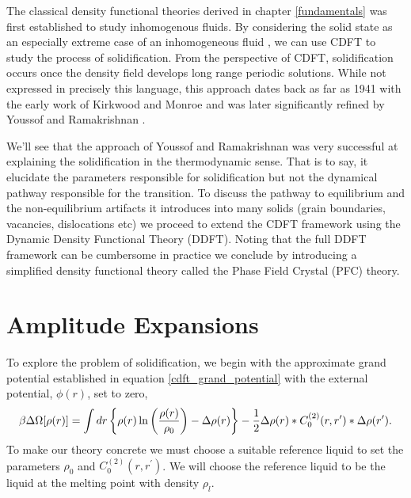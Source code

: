 \label{dft_of_freezing}

The classical density functional theories derived in chapter \ref{fundamentals}
was first established to study inhomogenous fluids.  By considering the solid
state as an especially extreme case of an inhomogeneous fluid
\cite{HANSEN-CH6}, we can use CDFT to study the process of solidification. From
the perspective of CDFT, solidification occurs once the density field develops
long range periodic solutions.  While not expressed in precisely this language,
this approach dates back as far as 1941 with the early work of Kirkwood and Monroe
\cite{KIRKWOOD_MONROE41} and was later significantly refined by Youssof and
Ramakrishnan \cite{RAMAKRISHNAN79}.

We'll see that the approach of Youssof and Ramakrishnan was very successful at 
explaining the solidification in the thermodynamic sense. That is to say, it
elucidate the parameters responsible for solidification but not the dynamical 
pathway responsible for the transition. To discuss the pathway to equilibrium
and the non-equilibrium artifacts it introduces into many solids (grain 
boundaries, vacancies, dislocations etc) we proceed to extend the CDFT framework
using the Dynamic Density Functional Theory (DDFT). Noting that the full DDFT
framework can be cumbersome in practice we conclude by introducing a simplified
density functional theory called the Phase Field Crystal (PFC) theory.

\section{Amplitude Expansions} %

To explore the problem of solidification, we begin with the approximate grand
potential established in equation \ref{cdft_grand_potential} with the external
potential, $\phi(r)$, set to zero,
%
\begin{equation}
    \beta \Delta \Omega[\rho(r)] =
        \int dr \left\lbrace 
            \rho(r)\ln\left(\frac{\rho(r)}{\rho_0}\right) - \Delta\rho(r)\right\rbrace
        - \frac{1}{2} \Delta\rho(r) \ast C^{(2)}_0(r, r^\prime)
            \ast \Delta\rho(r^\prime).
\end{equation}
%
To make our theory concrete we must choose a suitable reference liquid to set
the parameters $\rho_0$ and $C^{(2)}_0(r, r^\prime)$. We will choose the
reference liquid to be the liquid at the melting point with density $\rho_l$.

